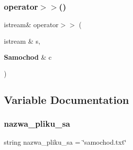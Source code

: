 \subsubsection{operator$>$$>$()}
{\footnotesize\ttfamily istream\& operator$>$$>$ (\begin{DoxyParamCaption}\item[{istream \&}]{s,  }\item[{\textbf{ Samochod} \&}]{c }\end{DoxyParamCaption})}



\subsection{Variable Documentation}
\mbox{\label{_samoch_xC3_xB3d_8cpp_ad00380e35acedd3fbdbec3054f5ee17c}} 
\subsubsection{nazwa\+\_\+pliku\+\_\+sa}
{\footnotesize\ttfamily string nazwa\+\_\+pliku\+\_\+sa = \char`\"{}samochod.\+txt\char`\"{}}


